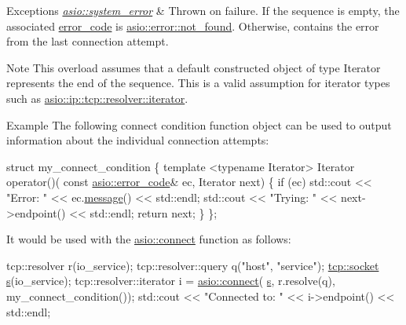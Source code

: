 \begin{DoxyExceptions}{Exceptions}
{\em \hyperlink{classasio_1_1system__error}{asio\+::system\+\_\+error}} & Thrown on failure. If the sequence is empty, the associated {\ttfamily \hyperlink{classasio_1_1error__code}{error\+\_\+code}} is \hyperlink{namespaceasio_1_1error_ade61a402d1dfb10b1c223906f5ea7847a6cfdfb1e108e927e2bfc847850ba0dcb}{asio\+::error\+::not\+\_\+found}. Otherwise, contains the error from the last connection attempt.\\
\hline
\end{DoxyExceptions}
\begin{DoxyNote}{Note}
This overload assumes that a default constructed object of type {\ttfamily Iterator} represents the end of the sequence. This is a valid assumption for iterator types such as {\ttfamily \hyperlink{classasio_1_1ip_1_1basic__resolver_ad1cc50a31ba4971329a34eb01ef5a21c}{asio\+::ip\+::tcp\+::resolver\+::iterator}}.
\end{DoxyNote}
\begin{DoxyParagraph}{Example}
The following connect condition function object can be used to output information about the individual connection attempts\+: 
\begin{DoxyCode}
 \textcolor{keyword}{struct }my\_connect\_condition
\{
  \textcolor{keyword}{template} <\textcolor{keyword}{typename} Iterator>
  Iterator operator()(
      \textcolor{keyword}{const} \hyperlink{classasio_1_1error__code}{asio::error\_code}& ec,
      Iterator next)
  \{
    \textcolor{keywordflow}{if} (ec) std::cout << \textcolor{stringliteral}{"Error: "} << ec.\hyperlink{classasio_1_1error__code_a9e15b346b9ec23275530835d9c150711}{message}() << std::endl;
    std::cout << \textcolor{stringliteral}{"Trying: "} << next->endpoint() << std::endl;
    \textcolor{keywordflow}{return} next;
  \}
\}; 
\end{DoxyCode}
 It would be used with the \hyperlink{group__connect_ga29acd61d7a875cef7dbd1f892be2906c}{asio\+::connect} function as follows\+: 
\begin{DoxyCode}
 tcp::resolver r(io\_service);
tcp::resolver::query q(\textcolor{stringliteral}{"host"}, \textcolor{stringliteral}{"service"});
\hyperlink{namespacewebsocketpp_1_1transport_1_1asio_1_1socket_1_1error_a828ddaa5ed63a761e1b557465a35f05aa0c31b356014843e1d09514e794a539a7}{tcp::socket} \hyperlink{group__async__connect_ga31ab74b9ea6c77932dddd016cfc7920a}{s}(io\_service);
tcp::resolver::iterator i = \hyperlink{group__connect_ga29acd61d7a875cef7dbd1f892be2906c}{asio::connect}(
    \hyperlink{group__async__connect_ga31ab74b9ea6c77932dddd016cfc7920a}{s}, r.resolve(q), my\_connect\_condition());
std::cout << \textcolor{stringliteral}{"Connected to: "} << i->endpoint() << std::endl; 
\end{DoxyCode}
 
\end{DoxyParagraph}


